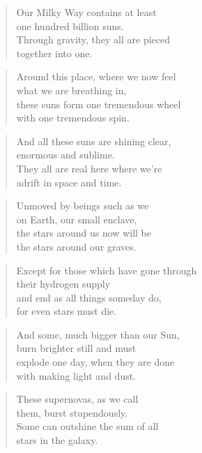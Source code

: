 \documentclass[10pt,a4paper]{article}
\begin{document}
\begin{paracol}{2}
\begin{verse}
Our Milky Way contains at least\\
one hundred billion suns.\\
Through gravity, they all are pieced\\
together into one.
\end{verse}

\begin{verse}
Around this place, where we now feel\\
what we are breathing in,\\
these suns form one tremendous wheel\\
with one tremendous spin.
\end{verse}

\begin{verse}
And all these suns are shining clear,\\
enormous and sublime.\\
They all are real here where we’re\\
adrift in space and time.
\end{verse}

\begin{verse}
Unmoved by beings such as we\\
on Earth, our small enclave,\\
the stars around us now will be\\
the stars around our graves.
\end{verse}

\begin{verse}
Except for those which have gone through\\
their hydrogen supply\\
and end as all things someday do,\\
for even stars must die.
\end{verse}

\begin{verse}
And some, much bigger than our Sun,\\
burn brighter still and must\\
explode one day, when they are done\\
with making light and dust.
\end{verse}

\begin{verse}
These supernovas, as we call\\
them, burst stupendously.\\
Some can outshine the sum of all\\
stars in the galaxy.
\end{verse}


\end{paracol}
\end{document}
